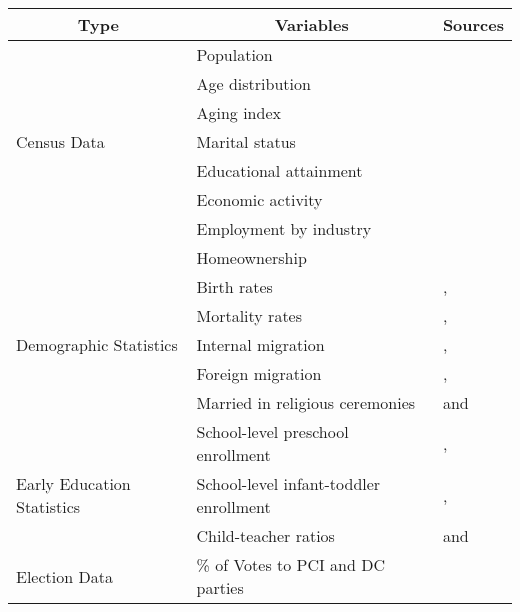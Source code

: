 \begin{tabular}{lll}
\toprule
\multicolumn{1}{c}{Type}	&	\multicolumn{1}{c}{Variables}	&	\multicolumn{1}{c}{Sources}	\\
\midrule
			&	Population & \\
			& 	Age distribution & \\
			&	Aging index & \\
Census Data	&	Marital status & \citet{Istat_2014_Atlante-Statistico} \\
			& 	Educational attainment & \\
			& 	Economic activity & \\
			& 	Employment by industry & \\
			& 	Homeownership	&	\\
\midrule
						&		Birth rates 			&	\citet{Reggio-Emilia-Admin-Data_1966-2010}, \\
						&	Mortality rates		& 	\citet{Padova-Admin-Data_1964-2010}, 	\\
	Demographic Statistics	&	 Internal migration 		&	\citet{Statistica-Regionae_2016_Veneto}, \\
						&	Foreign migration 	&  	\citet{Emilia-Romagna_2016_Population},\\
						&	Married in religious ceremonies		&	and \citet{Istat_2016_Geo-Demo} \\
\midrule
						&	School-level preschool enrollment	 &	\citet{Reggio-Annual-Journals_1994-2011}, \\
	Early Education Statistics	& 	School-level infant-toddler enrollment & 	\citet{Padova-Admin-Data_1964-2010},  \\
						& 	Child-teacher ratios				&	and \citet{Reggio-Emilia-Admin-Data_1966-2010} \\
\midrule
Election Data				&	\% of Votes to PCI and DC parties 	&	\citet{Archivo-Storico_2016} \\
\bottomrule
\end{tabular}

